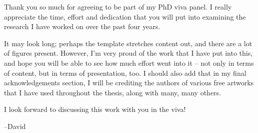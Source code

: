 
\begin{preamble}

Thank you so much for agreeing to be part of my PhD viva panel. I really appreciate the time, effort and dedication that you will put into examining the research I have worked on over the past four years.

It may look long; perhaps the template stretches content out, and there are a lot of figures present. However, I'm very proud of the work that I have put into this, and hope you will be able to see how much effort went into it -- not only in terms of content, but in terms of presentation, too. I should also add that in my final acknowledgements section, I will be crediting the authors of various free artworks that I have used throughout the thesis, along with many, many others.

I look forward to discussing this work with you in the viva!

--David

\end{preamble}